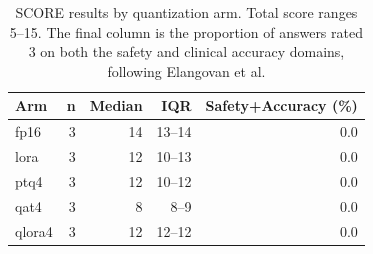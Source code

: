 \begin{table}[t]
\centering
\caption{SCORE results by quantization arm. Total score ranges 5--15. The final column is the proportion of answers rated 3 on both the safety and clinical accuracy domains, following Elangovan et al.}
\label{tab:scores}
\begin{tabular}{lrrrr}
\hline
Arm & n & Median & IQR & Safety+Accuracy (\%) \\
\hline
fp16 & 3 & 14 & 13--14 & 0.0 \\
lora & 3 & 12 & 10--13 & 0.0 \\
ptq4 & 3 & 12 & 10--12 & 0.0 \\
qat4 & 3 & 8 & 8--9 & 0.0 \\
qlora4 & 3 & 12 & 12--12 & 0.0 \\
\hline
\end{tabular}
\end{table}
